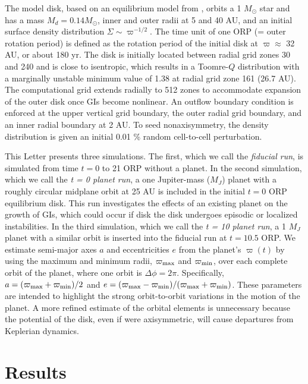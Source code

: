\documentclass[12pt,manuscript,authoryear]{aastex}
\begin{document}
The model disk, based on an equilibrium model from \citet{pickett2003}, orbits a 1 $M_{\odot}$ star and has a mass $M_d =
0.14 M_{\odot}$, inner and outer radii at 5 and 40 AU, and an initial surface density distribution $\Sigma \sim
\varpi^{-1/2}$. The time unit of one ORP (= outer rotation period) is defined as the rotation period of the initial disk
at $\varpi \approx$ 32 AU, or about 180 yr. The disk is initially located between radial grid zones 30 and 240 and is
close to isentropic, which results in a Toomre-$Q$ distribution with a marginally unstable \citep[see ][]{durisen2007}
minimum value of 1.38 at radial grid zone 161 (26.7 AU). The computational grid extends radially to 512 zones to
accommodate expansion of the outer disk once GIs become nonlinear. An outflow boundary condition is enforced at the
upper vertical grid boundary, the outer radial grid boundary, and an inner radial boundary at 2 AU. To seed
nonaxisymmetry, the density distribution is given an initial 0.01 \% random cell-to-cell perturbation.

This Letter presents three simulations. The first, which we call the {\sl fiducial run}, is simulated from time $t = 0$
to 21 ORP without a planet. In the second simulation, which we call the {\sl t = 0 planet run}, a one Jupiter-mass
($M_J$) planet with a roughly circular midplane orbit at 25 AU is included in the initial $t = 0$ ORP equilibrium
disk. This run investigates the effects of an existing planet on the growth of GIs, which could occur if disk the disk
undergoes episodic or localized instabilities. In the third simulation, which we call the {\sl t = 10 planet run}, a 1
$M_J$ planet with a similar orbit is inserted into the fiducial run at $t = 10.5$ ORP. We estimate semi-major axes $a$
and eccentricities $e$ from the planet's $\varpi(t)$ by using the maximum and minimum radii, $\varpi_{\rm max}$ and
$\varpi_{\rm min}$, over each complete orbit of the planet, where one orbit is $\Delta\phi=2\pi$. Specifically, $a =
(\varpi_{\rm max}+\varpi_{\rm min})/2$ and $e = (\varpi_{\rm max}-\varpi_{\rm min})/(\varpi_{\rm max}+\varpi_{\rm
  min})$. These parameters are intended to highlight the strong orbit-to-orbit variations in the motion of the planet.
A more refined estimate of the orbital elements is unnecessary because the potential of the disk, even if were
axisymmetric, will cause departures from Keplerian dynamics.

\section{Results}
\end{document}

